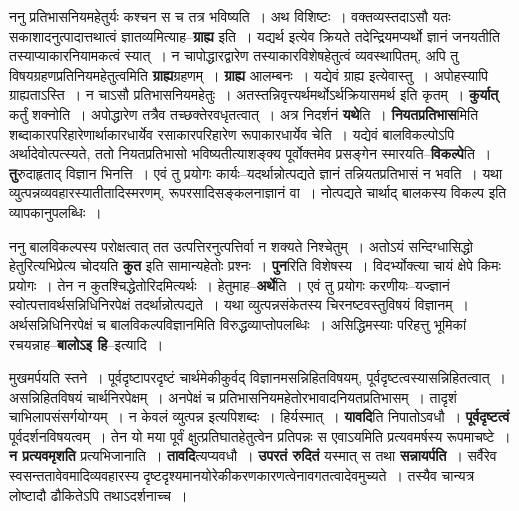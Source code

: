 \documentclass[article,12pt,a4paper]{memoir}
\begin{document}
	  \pstart ननु प्रतिभासनियमहेतुर्यः कश्चन स च तत्र भविष्यति । अथ विशिष्टः । वक्तव्यस्तदाऽसौ यतः सकाशादनुत्पादात्तथात्वं ज्ञातव्यमित्याह--\textbf{ग्राह्य} इति । यद्यर्थ इत्येव क्रियते तदेन्द्रियमप्यर्थो ज्ञानं जनयतीति तस्याप्याकारनियामकत्वं स्यात् । न चापोद्धारद्वारेण तस्याकारविशेषहेतुत्वं व्यवस्थापितम्, अपि तु विषयग्रहणप्रतिनियमहेतुत्वमिति \textbf{ग्राह्य}ग्रहणम् । \textbf{ग्राह्य} आलम्बनः । यद्येवं ग्राह्य इत्येवास्तु । अपोहस्यापि ग्राह्यताऽस्ति । न चाऽसौ प्रतिभासनियमहेतुः । अतस्तन्निवृत्त्यर्थमर्थोऽर्थक्रियासमर्थ इति कृतम् । \textbf{कुर्यात्} कर्तुं शक्नोति । अपोद्धारेण तत्रैव तच्छक्तेरवधृतत्वात् । अत्र निदर्शनं \textbf{यथे}ति । \textbf{नियतप्रतिभास}मिति शब्दाकारपरिहारेणार्थाकारधार्येव रसाकारपरिहारेण रूपाकारधार्येव चेति । यद्येवं बालविकल्पोऽपि अर्थादेवोत्पत्स्यते, ततो नियतप्रतिभासो भविष्यतीत्याशङ्क्य पूर्वोक्तमेव प्रसङ्गेन स्मारयति--\textbf{विकल्पे}ति । \textbf{तु}रुदाहृताद् विज्ञान भिनत्ति । एवं तु प्रयोगः कार्यः--यदर्थान्नोत्पद्यते ज्ञानं तन्नियतप्रतिभासं न भवति । यथा व्युत्पन्नव्यवहारस्यातीतादिस्मरणम्, रूपरसादिसङ्कलनाज्ञानं वा । नोत्पद्यते चा\leavevmode{}र्थाद् बालकस्य विकल्प इति व्यापकानुपलब्धिः ।
	\pend
      

	  \pstart ननु बालविकल्पस्य परोक्षत्वात् तत उत्पत्तिरनुत्पत्तिर्वा न शक्यते निश्चेतुम् । अतोऽयं सन्दिग्धासिद्धो हेतुरित्यभिप्रेत्य चोदयति \textbf{कुत} इति सामान्यहेतोः प्रश्नः । \textbf{पुन}रिति विशेषस्य । विदर्भ्योक्त्या चायं क्षेपे किमः प्रयोगः । तेन न कुतश्चिद्धेतोरिदमित्यर्थः । हेतुमाह--\textbf{अर्थे}ति । एवं तु प्रयोगः करणीयः--यज्ज्ञानं स्वोत्पत्तावर्थसन्निधिनिरपेक्षं तदर्थान्नोत्पद्यते । यथा व्युत्पन्नसंकेतस्य चिरनष्टवस्तुविषयं विज्ञानम् । अर्थसन्निधिनिरपेक्षं च बालविकल्पविज्ञानमिति विरुद्धव्याप्तोपलब्धिः । असिद्धिमस्याः परिहत्तु भूमिकां रचयन्नाह--\textbf{बालोऽइ हि}--इत्यादि । \leavevmode{} 
	  
	मुखमर्पयति स्तने । पूर्वदृष्टापरदृष्टं चार्थमेकीकुर्वद् विज्ञानमसन्निहितविषयम्, पूर्वदृष्टत्वस्यासन्निहितत्वात् । असन्निहितविषयं चार्थनिरपेक्षम् । अनपेक्षं च प्रतिभासनियमहेतोरभावादनियतप्रतिभासम् । तादृशं चाभिलापसंसर्गयोग्यम् । न केवलं व्युत्पन्न इत्यपिशब्दः । हिर्यस्मात् । \textbf{यावदि}ति निपातोऽवधौ । \textbf{पूर्वदृष्टत्वं} पूर्वदर्शनविषयत्वम् । तेन यो मया पूर्वं क्षुत्प्रतिघातहेतुत्वेन प्रतिपन्नः स एवाऽयमिति प्रत्यवमर्षस्य रूपमाचष्टे । \textbf{न प्रत्यवमृशति} प्रत्यभिजानाति । \textbf{तावदि}त्यप्यवधौ । \textbf{उपरतं रुदितं} यस्मात् स तथा \textbf{सन्नायर्पति} । सर्वैरेव स्वसन्ततावेवमादिव्यवहारस्य दृष्टदृश्यमानयोरेकीकरणकारणत्वेनावगतत्वादेवमुच्यते । तस्यैव चान्यत्र लोष्टादौ ढौकितेऽपि तथाऽदर्शनाच्च ।
	\pend
      
\end{document}

